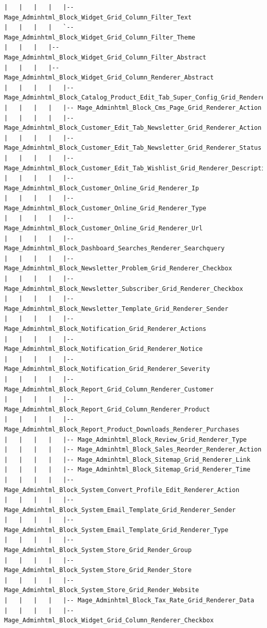 \documentclass[oneside]{book}
\begin{document}
\begin{lstlisting}
|   |   |   |   |-- Mage_Adminhtml_Block_Widget_Grid_Column_Filter_Text
|   |   |   |   `-- Mage_Adminhtml_Block_Widget_Grid_Column_Filter_Theme
|   |   |   |-- Mage_Adminhtml_Block_Widget_Grid_Column_Filter_Abstract
|   |   |   |-- Mage_Adminhtml_Block_Widget_Grid_Column_Renderer_Abstract
|   |   |   |   |-- Mage_Adminhtml_Block_Catalog_Product_Edit_Tab_Super_Config_Grid_Renderer_Inventory
|   |   |   |   |-- Mage_Adminhtml_Block_Cms_Page_Grid_Renderer_Action
|   |   |   |   |-- Mage_Adminhtml_Block_Customer_Edit_Tab_Newsletter_Grid_Renderer_Action
|   |   |   |   |-- Mage_Adminhtml_Block_Customer_Edit_Tab_Newsletter_Grid_Renderer_Status
|   |   |   |   |-- Mage_Adminhtml_Block_Customer_Edit_Tab_Wishlist_Grid_Renderer_Description
|   |   |   |   |-- Mage_Adminhtml_Block_Customer_Online_Grid_Renderer_Ip
|   |   |   |   |-- Mage_Adminhtml_Block_Customer_Online_Grid_Renderer_Type
|   |   |   |   |-- Mage_Adminhtml_Block_Customer_Online_Grid_Renderer_Url
|   |   |   |   |-- Mage_Adminhtml_Block_Dashboard_Searches_Renderer_Searchquery
|   |   |   |   |-- Mage_Adminhtml_Block_Newsletter_Problem_Grid_Renderer_Checkbox
|   |   |   |   |-- Mage_Adminhtml_Block_Newsletter_Subscriber_Grid_Renderer_Checkbox
|   |   |   |   |-- Mage_Adminhtml_Block_Newsletter_Template_Grid_Renderer_Sender
|   |   |   |   |-- Mage_Adminhtml_Block_Notification_Grid_Renderer_Actions
|   |   |   |   |-- Mage_Adminhtml_Block_Notification_Grid_Renderer_Notice
|   |   |   |   |-- Mage_Adminhtml_Block_Notification_Grid_Renderer_Severity
|   |   |   |   |-- Mage_Adminhtml_Block_Report_Grid_Column_Renderer_Customer
|   |   |   |   |-- Mage_Adminhtml_Block_Report_Grid_Column_Renderer_Product
|   |   |   |   |-- Mage_Adminhtml_Block_Report_Product_Downloads_Renderer_Purchases
|   |   |   |   |-- Mage_Adminhtml_Block_Review_Grid_Renderer_Type
|   |   |   |   |-- Mage_Adminhtml_Block_Sales_Reorder_Renderer_Action
|   |   |   |   |-- Mage_Adminhtml_Block_Sitemap_Grid_Renderer_Link
|   |   |   |   |-- Mage_Adminhtml_Block_Sitemap_Grid_Renderer_Time
|   |   |   |   |-- Mage_Adminhtml_Block_System_Convert_Profile_Edit_Renderer_Action
|   |   |   |   |-- Mage_Adminhtml_Block_System_Email_Template_Grid_Renderer_Sender
|   |   |   |   |-- Mage_Adminhtml_Block_System_Email_Template_Grid_Renderer_Type
|   |   |   |   |-- Mage_Adminhtml_Block_System_Store_Grid_Render_Group
|   |   |   |   |-- Mage_Adminhtml_Block_System_Store_Grid_Render_Store
|   |   |   |   |-- Mage_Adminhtml_Block_System_Store_Grid_Render_Website
|   |   |   |   |-- Mage_Adminhtml_Block_Tax_Rate_Grid_Renderer_Data
|   |   |   |   |-- Mage_Adminhtml_Block_Widget_Grid_Column_Renderer_Checkbox

\end{lstlisting}
\end{document}
